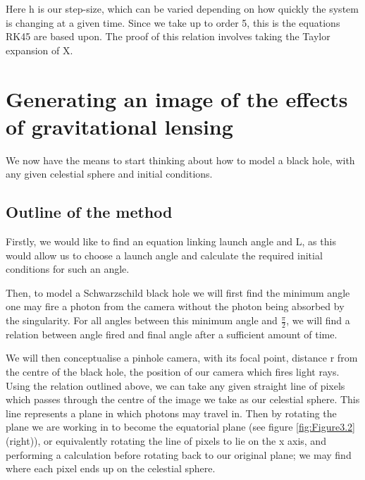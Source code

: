 \documentclass[oneside,openright,frontopenright, singlespacing]{dmathesis}
\begin{document}
\vspace{1em}
	Here h is our step-size, which can be varied depending on how quickly the system is changing at a given time. Since we take up to order 5, this is the equations RK45 are based upon. The proof of this relation involves taking the Taylor expansion of X.

\section{Generating an image of the effects of gravitational lensing}\label{sec:Section3.5}

	We now have the means to start thinking about how to model a black hole, with any given celestial sphere and initial conditions.

\subsection{Outline of the method}\label{subsec:Subsection3.5.1}

	Firstly, we would like to find an equation linking launch angle and L, as this would allow us to choose a launch angle and calculate the required initial conditions for such an angle.

\vspace{1em}
	Then, to model a Schwarzschild black hole we will first find the minimum angle one may fire a photon from the camera without the photon being absorbed by the singularity. For all angles between this minimum angle and $\frac{\pi}{2}$, we will find a relation between angle fired and final angle after a sufficient amount of time.

\vspace{1em}
	We will then conceptualise a pinhole camera, with its focal point, distance r from the centre of the black hole, the position of our camera which fires light rays. Using the relation outlined above, we can take any given straight line of pixels which passes through the centre of the image we take as our celestial sphere. This line represents a plane in which photons may travel in. Then by rotating the plane we are working in to become the equatorial plane (see figure \ref{fig:Figure3.2} (right)), or equivalently rotating the line of pixels to lie on the x axis, and performing a calculation before rotating back to our original plane; we may find where each pixel ends up on the celestial sphere.
\end{document}
